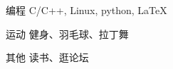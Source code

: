 \vspace{-4.0mm}


\begin{cvskills}


\cvskill
{编程} %
{C/C++, Linux, python, \LaTeX} %

\cvskill
{运动} %
{健身、羽毛球、拉丁舞} %

\cvskill
{其他} %
{读书、逛论坛} %

\end{cvskills}